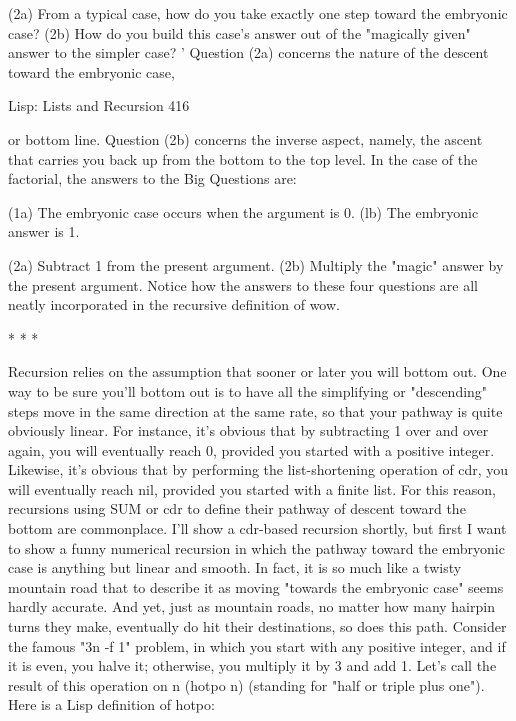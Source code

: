         (2a) From a typical case, how do you take exactly one step toward the
embryonic case?
        (2b) How do you build this case's answer out of the "magically given" answer
to the simpler case?
        ' Question (2a) concerns the nature of the descent toward the embryonic case,




Lisp: Lists and Recursion                                                             416

or bottom line. Question (2b) concerns the inverse aspect, namely, the ascent that
carries you back up from the bottom to the top level. In the case of the factorial, the
answers to the Big Questions are:

       (1a) The embryonic case occurs when the argument is 0.
       (lb) The embryonic answer is 1.

        (2a) Subtract 1 from the present argument.
        (2b) Multiply the "magic" answer by the present argument.
        Notice how the answers to these four questions are all neatly incorporated in
the recursive definition of wow.

                                          *   *   *

        Recursion relies on the assumption that sooner or later you will bottom out.
One way to be sure you'll bottom out is to have all the simplifying or "descending"
steps move in the same direction at the same rate, so that your pathway is quite
obviously linear. For instance, it's obvious that by subtracting 1 over and over again,
you will eventually reach 0, provided you started with a positive integer. Likewise, it's
obvious that by performing the list-shortening operation of cdr, you will eventually
reach nil, provided you started with a finite list. For this reason, recursions using
SUM or cdr to define their pathway of descent toward the bottom are commonplace.
I'll show a cdr-based recursion shortly, but first I want to show a funny numerical
recursion in which the pathway toward the embryonic case is anything but linear and
smooth. In fact, it is so much like a twisty mountain road that to describe it as moving
"towards the embryonic case" seems hardly accurate. And yet, just as mountain roads,
no matter how many hairpin turns they make, eventually do hit their destinations, so
does this path.
        Consider the famous "3n -f 1" problem, in which you start with any positive
integer, and if it is even, you halve it; otherwise, you multiply it by 3 and add 1. Let's
call the result of this operation on n (hotpo n) (standing for "half or triple plus one").
Here is a Lisp definition of hotpo:

